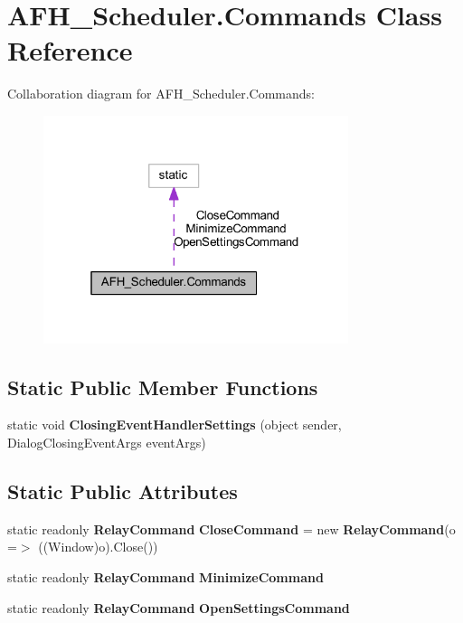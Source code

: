 \section{A\+F\+H\+\_\+\+Scheduler.\+Commands Class Reference}
\label{class_a_f_h___scheduler_1_1_commands}


Collaboration diagram for A\+F\+H\+\_\+\+Scheduler.\+Commands\+:
\nopagebreak
\begin{figure}[H]
\begin{center}
\leavevmode
\includegraphics[width=253pt]{class_a_f_h___scheduler_1_1_commands__coll__graph}
\end{center}
\end{figure}
\subsection*{Static Public Member Functions}
\begin{DoxyCompactItemize}
\item 
static void \textbf{ Closing\+Event\+Handler\+Settings} (object sender, Dialog\+Closing\+Event\+Args event\+Args)
\end{DoxyCompactItemize}
\subsection*{Static Public Attributes}
\begin{DoxyCompactItemize}
\item 
static readonly \textbf{ Relay\+Command} \textbf{ Close\+Command} = new \textbf{ Relay\+Command}(o =$>$ ((Window)o).Close())
\item 
static readonly \textbf{ Relay\+Command} \textbf{ Minimize\+Command}
\item 
static readonly \textbf{ Relay\+Command} \textbf{ Open\+Settings\+Command}
\end{DoxyCompactItemize}


